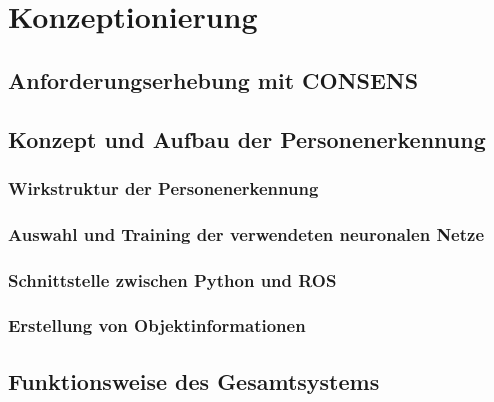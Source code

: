 \chapter{Konzeptionierung}
\label{ch: Konzeptionierung}

	
	
	\section{Anforderungserhebung mit CONSENS}
	\label{sec: Anforderungserhebung}
			
	
	\section{Konzept und Aufbau der Personenerkennung}
	
		\subsection{Wirkstruktur der Personenerkennung}
		
		\subsection{Auswahl und Training der verwendeten neuronalen Netze}
		
		\subsection{Schnittstelle zwischen Python und ROS}
		
		\subsection{Erstellung von Objektinformationen}
	
	\section{Funktionsweise des Gesamtsystems}
	
		
		
				   		


